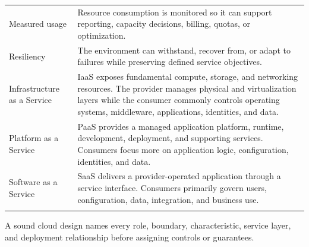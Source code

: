 \documentclass[11pt]{article}
\begin{document}
\begin{longtable}{@{}>{\RaggedRight\arraybackslash}p{}>{\RaggedRight\arraybackslash}p{}@{}}
Measured usage & Resource consumption is monitored so it can support reporting, capacity decisions, billing, quotas, or optimization. \\\addlinespace[2pt]
Resiliency & The environment can withstand, recover from, or adapt to failures while preserving defined service objectives. \\\addlinespace[2pt]
Infrastructure as a Service & IaaS exposes fundamental compute, storage, and networking resources. The provider manages physical and virtualization layers while the consumer commonly controls operating systems, middleware, applications, identities, and data. \\\addlinespace[2pt]
Platform as a Service & PaaS provides a managed application platform, runtime, development, deployment, and supporting services. Consumers focus more on application logic, configuration, identities, and data. \\\addlinespace[2pt]
Software as a Service & SaaS delivers a provider-operated application through a service interface. Consumers primarily govern users, configuration, data, integration, and business use. \\\addlinespace[2pt]
\bottomrule
\end{longtable}
\begin{takeawaybox}
A sound cloud design names every role, boundary, characteristic, service layer, and deployment relationship before assigning controls or guarantees.
\end{takeawaybox}
\end{document}
